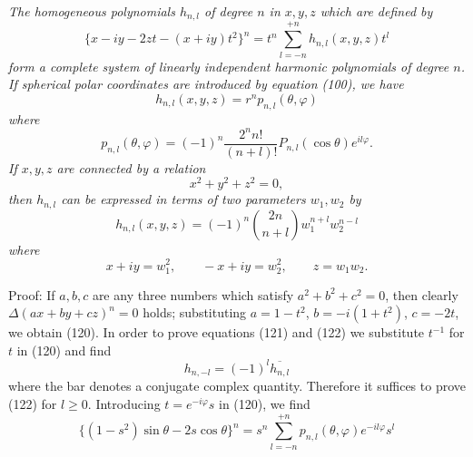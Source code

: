 \emph{The homogeneous polynomials $h_{n,l}$ of degree $n$ in $x,y,z$ which are defined by}
\begin{equation}\tag{120}
\{x-iy-2zt-(x+iy)t^2\}^n
=t^n\sum_{l=-n}^{+n}h_{n,l}(x,y,z)t^l
\end{equation}
\emph{form a complete system of linearly independent harmonic polynomials of degree $n$. If spherical polar coordinates are introduced by equation (100), we have}
\begin{equation}\tag{121}
h_{n,l}(x,y,z)=r^np_{n,l}(\theta,\varphi)
\end{equation}
\emph{where}
\begin{equation}\tag{122}
p_{n,l}(\theta,\varphi)=(-1)^n\frac{2^nn!}{(n+l)!}P_{n,l}(\cos\theta)e^{il\varphi}.
\end{equation}
\emph{If $x,y,z$ are connected by a relation}
\begin{equation}\tag{123}
x^2+y^2+z^2=0,
\end{equation}
\emph{then $h_{n,l}$ can be expressed in terms of two parameters $w_1,w_2$ by}
\begin{equation}\tag{124}
h_{n,l}(x,y,z)=(-1)^n\binom{2n}{n+l}w_1^{n+l}w_2^{n-l}
\end{equation}
\emph{where}
\begin{equation}\tag{125}
x+iy=w_1^2,\qquad -x+iy=w_2^2,\qquad z=w_1w_2.
\end{equation}

Proof: If $a,b,c$ are any three numbers which satisfy $a^2+b^2+c^2=0$, then clearly $\Delta(ax+by+cz)^n=0$ holds; substituting $a=1-t^2$, $b=-i(1+t^2)$, $c=-2t$, we obtain (120). In order to prove equations (121) and (122) we substitute $t^{-1}$ for $t$ in (120) and find
\begin{equation}\tag{126}
h_{n,-l}=(-1)^l\overline{h_{n,l}}
\end{equation}
where the bar denotes a conjugate complex quantity. Therefore it suffices to prove (122) for $l\ge0$. Introducing $t=e^{-i\varphi}s$ in (120), we find
\begin{equation}\tag{127}
\{(1-s^2)\sin\theta-2s\cos\theta\}^n
=s^n\sum_{l=-n}^{+n}p_{n,l}(\theta,\varphi)e^{-il\varphi}s^l
\end{equation}

